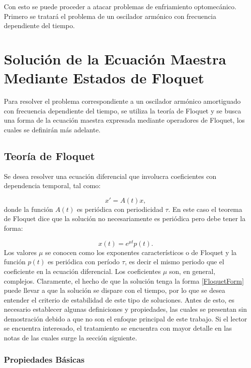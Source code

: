 \documentclass[a4paper,10pt]{report}
\begin{document}
Con esto se puede proceder a atacar problemas de enfriamiento optomecánico. Primero se tratará el problema de un oscilador armónico con frecuencia dependiente del tiempo.


\chapter{Solución de la Ecuación Maestra Mediante Estados de Floquet}

Para resolver el problema correspondiente a un oscilador armónico amortiguado con frecuencia dependiente del tiempo, se utiliza la teoría de Floquet \cite{WardFT}y se busca una forma de la ecuación maestra expresada mediante operadores de Floquet, los cuales se definirán más adelante.

\section{Teoría de Floquet}

Se desea resolver una ecuación diferencial que involucra coeficientes con dependencia temporal, tal como:

\begin{equation}\label{FloquetEquation}
x' = A(t)x,
\end{equation} donde la función $A(t)$ es periódica con periodicidad $\tau$. En este caso el teorema de Floquet\cite{WardFT} dice que la solución no necesariamente es periódica pero debe tener la forma:

\begin{equation}\label{FloquetForm}
x(t)=e^{\mu t}p(t).
\end{equation} Los valores $\mu$ se conocen como los exponentes característicos o de Floquet y la función $p(t)$ es periódica con período $\tau$, es decir el mismo periodo que el coeficiente en la ecuación diferencial. Los coeficientes $\mu$ son, en general, complejos. Claramente, el hecho de que la solución tenga la forma \ref{FloquetForm} puede llevar a que la solución se dispare con el tiempo, por lo que se desea entender el criterio de estabilidad de este tipo de soluciones. Antes de esto, es necesario establecer algunas definiciones y propiedades, las cuales se presentan sin demostración debido a que no son el enfoque principal de este trabajo. Si el lector se encuentra interesado, el tratamiento se encuentra con mayor detalle en las notas de las cuales surge la sección siguiente. \cite{WardFT}

\subsection{Propiedades Básicas}
\end{document}
